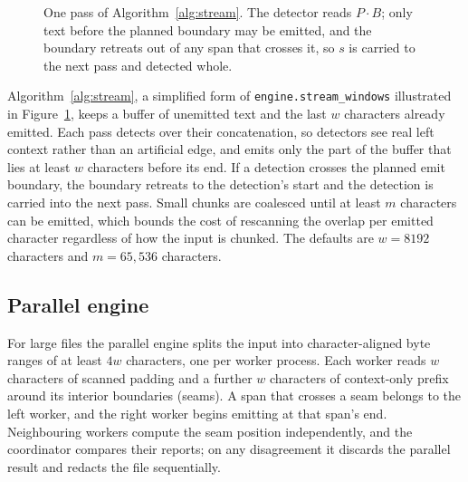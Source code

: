 \documentclass[pdflatex,sn-mathphys-num]{sn-jnl}
\theoremstyle{\ssThmStyle}
\theoremstyle{\ssDefStyle}
\begin{document}
\begin{figure}[t]
\centering
{}
\caption{One pass of Algorithm~\ref{alg:stream}. The detector reads $P \cdot B$; only text before the planned boundary may be emitted, and the boundary retreats out of any span that crosses it, so $s$ is carried to the next pass and detected whole.}\label{fig:window}
\end{figure}

Algorithm~\ref{alg:stream}, a simplified form of \texttt{engine.stream\_windows} illustrated in Figure~\ref{fig:window}, keeps a buffer of unemitted text and the last $w$ characters already emitted. Each pass detects over their concatenation, so detectors see real left context rather than an artificial edge, and emits only the part of the buffer that lies at least $w$ characters before its end. If a detection crosses the planned emit boundary, the boundary retreats to the detection's start and the detection is carried into the next pass. Small chunks are coalesced until at least $m$ characters can be emitted, which bounds the cost of rescanning the overlap per emitted character regardless of how the input is chunked. The defaults are $w = 8192$ characters and $m = 65{,}536$ characters.

\subsection{Parallel engine}
For large files the parallel engine splits the input into character-aligned byte ranges of at least $4w$ characters, one per worker process. Each worker reads $w$ characters of scanned padding and a further $w$ characters of context-only prefix around its interior boundaries (seams). A span that crosses a seam belongs to the left worker, and the right worker begins emitting at that span's end. Neighbouring workers compute the seam position independently, and the coordinator compares their reports; on any disagreement it discards the parallel result and redacts the file sequentially.
\end{document}
